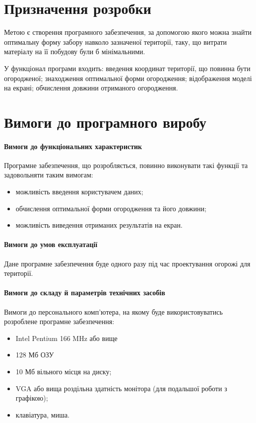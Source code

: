 \documentclass[a4paper,12pt,notitlepage,pdftex]{scrartcl}
\begin{document}
\section{Призначення розробки}
    Метою є створення програмного забезпечення, за допомогою якого можна
    знайти оптимальну форму забору навколо зазначеної території, таку, що
    витрати матеріалу на її побудову були б мінімальними.

    У функціонал програми входить: введення координат території, що повинна
    бути огородженої; знаходження оптимальної форми огородження; відображення
    моделі на екрані; обчислення довжини отриманого огородження.

\section{Вимоги до програмного виробу}
    \paragraph{Вимоги до функціональних характеристик}
        Програмне забезпечення, що розробляється, повинно виконувати такі
        функції та задовольняти таким вимогам:
        \begin{itemize}
            \item можливість введення користувачем даних;
            \item обчислення оптимальної форми огородження та його довжини;
            \item можливість виведення отриманих результатів на екран.
        \end{itemize}

    \paragraph{Вимоги до умов експлуатації}
        Дане програмне забезпечення буде одного разу під час проектування
        огорожі для території.

    \paragraph{Вимоги до складу й параметрів технічних засобів}
        Вимоги до персонального комп’ютера, на якому буде використовуватись
        розроблене програмне забезпечення:
        \begin{itemize}
            \item Intel Pentium 166 MHz або вище
            \item 128 Мб ОЗУ
            \item 10 Мб вільного місця на диску;
            \item VGA або вища роздільна здатність монітора (для подальшої
                роботи з графікою);
            \item клавіатура, миша.
        \end{itemize}
\end{document}
